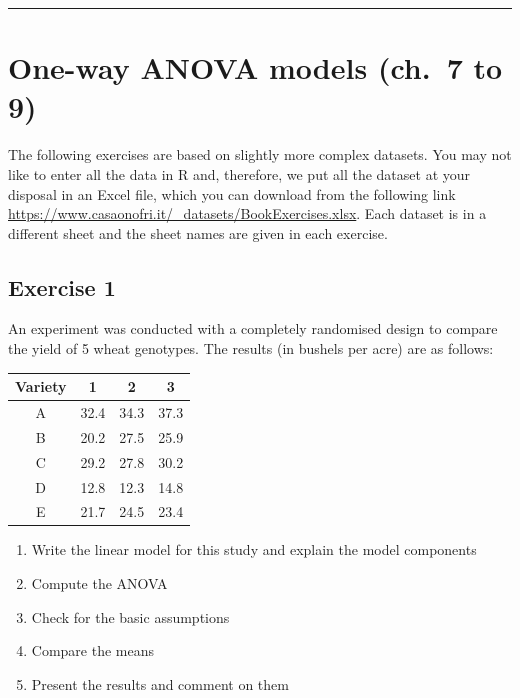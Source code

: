 \documentclass[a4paper,12pt,oneside]{book}
\providecommand{\tightlist}{%
  \setlength{\itemsep}{0pt}\setlength{\parskip}{0pt}}
\begin{document}
\begin{center}\rule{0.5\linewidth}{0.5pt}\end{center}

\hypertarget{one-way-anova-models-ch.-7-to-9}{%
\section{One-way ANOVA models (ch.~7 to 9)}\label{one-way-anova-models-ch.-7-to-9}}

The following exercises are based on slightly more complex datasets. You may not like to enter all the data in R and, therefore, we put all the dataset at your disposal in an Excel file, which you can download from the following link \url{https://www.casaonofri.it/_datasets/BookExercises.xlsx}. Each dataset is in a different sheet and the sheet names are given in each exercise.

\hypertarget{exercise-1-4}{%
\subsection{Exercise 1}\label{exercise-1-4}}

An experiment was conducted with a completely randomised design to compare the yield of 5 wheat genotypes. The results (in bushels per acre) are as follows:

\begin{longtable}[]{@{}cccc@{}}
\toprule
Variety & 1 & 2 & 3 \\
\midrule
\endhead
A & 32.4 & 34.3 & 37.3 \\
B & 20.2 & 27.5 & 25.9 \\
C & 29.2 & 27.8 & 30.2 \\
D & 12.8 & 12.3 & 14.8 \\
E & 21.7 & 24.5 & 23.4 \\
\bottomrule
\end{longtable}

\begin{enumerate}
\def\labelenumi{\arabic{enumi}.}
\tightlist
\item
  Write the linear model for this study and explain the model components
\item
  Compute the ANOVA
\item
  Check for the basic assumptions
\item
  Compare the means
\item
  Present the results and comment on them
\end{enumerate}
\end{document}
